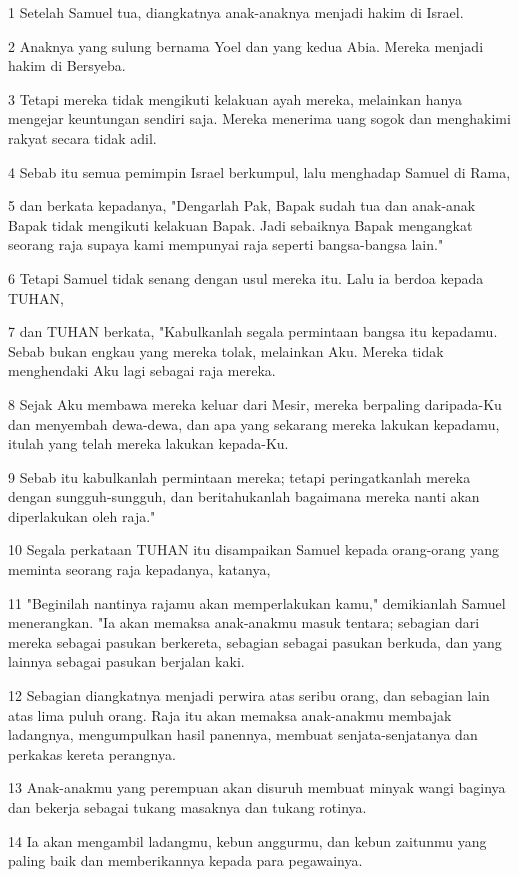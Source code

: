 \par 1 Setelah Samuel tua, diangkatnya anak-anaknya menjadi hakim di Israel.
\par 2 Anaknya yang sulung bernama Yoel dan yang kedua Abia. Mereka menjadi hakim di Bersyeba.
\par 3 Tetapi mereka tidak mengikuti kelakuan ayah mereka, melainkan hanya mengejar keuntungan sendiri saja. Mereka menerima uang sogok dan menghakimi rakyat secara tidak adil.
\par 4 Sebab itu semua pemimpin Israel berkumpul, lalu menghadap Samuel di Rama,
\par 5 dan berkata kepadanya, "Dengarlah Pak, Bapak sudah tua dan anak-anak Bapak tidak mengikuti kelakuan Bapak. Jadi sebaiknya Bapak mengangkat seorang raja supaya kami mempunyai raja seperti bangsa-bangsa lain."
\par 6 Tetapi Samuel tidak senang dengan usul mereka itu. Lalu ia berdoa kepada TUHAN,
\par 7 dan TUHAN berkata, "Kabulkanlah segala permintaan bangsa itu kepadamu. Sebab bukan engkau yang mereka tolak, melainkan Aku. Mereka tidak menghendaki Aku lagi sebagai raja mereka.
\par 8 Sejak Aku membawa mereka keluar dari Mesir, mereka berpaling daripada-Ku dan menyembah dewa-dewa, dan apa yang sekarang mereka lakukan kepadamu, itulah yang telah mereka lakukan kepada-Ku.
\par 9 Sebab itu kabulkanlah permintaan mereka; tetapi peringatkanlah mereka dengan sungguh-sungguh, dan beritahukanlah bagaimana mereka nanti akan diperlakukan oleh raja."
\par 10 Segala perkataan TUHAN itu disampaikan Samuel kepada orang-orang yang meminta seorang raja kepadanya, katanya,
\par 11 "Beginilah nantinya rajamu akan memperlakukan kamu," demikianlah Samuel menerangkan. "Ia akan memaksa anak-anakmu masuk tentara; sebagian dari mereka sebagai pasukan berkereta, sebagian sebagai pasukan berkuda, dan yang lainnya sebagai pasukan berjalan kaki.
\par 12 Sebagian diangkatnya menjadi perwira atas seribu orang, dan sebagian lain atas lima puluh orang. Raja itu akan memaksa anak-anakmu membajak ladangnya, mengumpulkan hasil panennya, membuat senjata-senjatanya dan perkakas kereta perangnya.
\par 13 Anak-anakmu yang perempuan akan disuruh membuat minyak wangi baginya dan bekerja sebagai tukang masaknya dan tukang rotinya.
\par 14 Ia akan mengambil ladangmu, kebun anggurmu, dan kebun zaitunmu yang paling baik dan memberikannya kepada para pegawainya.
